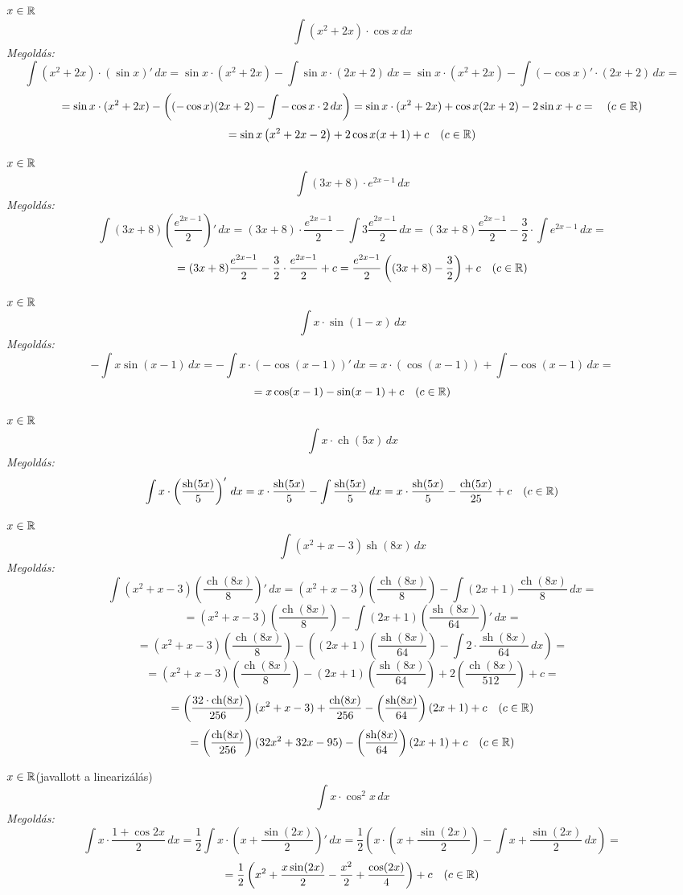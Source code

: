 \documentclass[a4paper,11.5pt]{article}
\DeclareMathOperator{\sh}{sh}
\DeclareMathOperator{\ch}{ch}
\begin{document}
	\begin{exercise}$x\in\mathbb{R}$
		\[ \int(x^2+2x)\cdot\cos x\,dx \]
		\textit{Megoldás:}
		\[ \int(x^2+2x)\cdot(\sin x)'\,dx = \sin x \cdot(x^2+2x)-\int\sin x\cdot(2x + 2)\,dx= \sin x \cdot(x^2+2x)-\int(-\cos x)'\cdot(2x + 2)\,dx= \]
		\[ =\sin x\cdot(x^2+2x)-\left((-\cos x)(2x+2)-\int-\cos x\cdot2\,dx\right)=\sin x\cdot(x^2+2x)+\cos x(2x+2)-2\sin x + c=\quad (c\in\mathbb{R}) \]
		\[ =\sin x\left(x^2+2x -2 \right)+2\cos x(x+1) + c\quad (c\in\mathbb{R}) \]
	\end{exercise}
	\begin{exercise}$x\in\mathbb{R}$
		\[ \int(3x+8)\cdot e^{2x-1}\,dx\]
		\textit{Megoldás:}
		\[\int(3x+8)\left(\frac{e^{2x-1}}{2}\right)'\,dx=(3x+8)\cdot\frac{e^{2x-1}}{2}-\int3\frac{e^{2x-1}}{2}\,dx=(3x+8)\frac{e^{2x-1}}{2}-\frac{3}{2}\cdot\int e^{2x-1}\,dx= \]
		\[ =(3x+8)\frac{e^{2x-1}}{2}-\frac{3}{2}\cdot\frac{e^{2x-1}}{2}+c=\frac{e^{2x-1}}{2}\left((3x+8)-\frac{3}{2}\right)+c\quad (c\in\mathbb{R}) \]
	\end{exercise}
	\begin{exercise}$x\in\mathbb{R}$
		\[ \int x\cdot\sin(1-x)\,dx \]
		\textit{Megoldás:}
		\[ -\int x\sin(x-1)\,dx=-\int x\cdot(-\cos(x-1))'\,dx=x\cdot(\cos(x-1))+\int-\cos(x-1)\,dx=\]
		\[=x\cos(x-1)-\sin(x-1)+c\quad (c\in\mathbb{R}) \]
	\end{exercise}
	\begin{exercise}$x\in\mathbb{R}$
		\[ \int x\cdot\ch(5x)\,dx \]
		\textit{Megoldás:}
		\[ \int x\cdot\left(\frac{\sh(5x)}{5}\right)'\,dx=x\cdot\frac{\sh(5x)}{5}-\int\frac{\sh(5x)}{5}\,dx=x\cdot\frac{\sh(5x)}{5}-\frac{\ch(5x)}{25}+c\quad (c\in\R) \]
	\end{exercise}
	\begin{exercise}$x\in\mathbb{R}$
		\[ \int(x^2+x-3)\sh(8x)\,dx \]
		\textit{Megoldás:}
		\[ \int(x^2+x-3)\left(\frac{\ch(8x)}{8}\right)'\,dx=(x^2+x-3)\left(\frac{\ch(8x)}{8}\right)-\int(2x+1)\frac{\ch(8x)}{8}\,dx=\]
		\[=(x^2+x-3)\left(\frac{\ch(8x)}{8}\right)-\int(2x+1)\left(\frac{\sh(8x)}{64}\right)'\,dx=\]
		\[=(x^2+x-3)\left(\frac{\ch(8x)}{8}\right)-\left((2x+1)\left(\frac{\sh(8x)}{64}\right)-\int2\cdot\frac{\sh(8x)}{64}\,dx\right)=\]
		\[=(x^2+x-3)\left(\frac{\ch(8x)}{8}\right)-(2x+1)\left(\frac{\sh(8x)}{64}\right)+2\left(\frac{\ch(8x)}{512}\right)+c= \]
		\[ =\left(\frac{32\cdot\ch(8x)}{256}\right)(x^2+x-3)+\frac{\ch(8x)}{256}-\left(\frac{\sh(8x)}{64}\right)(2x+1)+c\quad (c\in\R) \]
		\[ =\left(\frac{\ch(8x)}{256}\right)(32x^2+32x-95)-\left(\frac{\sh(8x)}{64}\right)(2x+1)+c\quad (c\in\R) \]
	\end{exercise}
	\begin{exercise} $x\in\mathbb{R}$\quad (javallott a linearizálás)
		\[ \int x\cdot\cos^2x\,dx \]
		\textit{Megoldás:}
		\[ \int x\cdot\frac{1+\cos2x}{2}\,dx=\frac{1}{2}\int x\cdot\left(x+\frac{\sin(2x)}{2}\right)'\,dx=\frac{1}{2}\left(x\cdot\left(x+\frac{\sin(2x)}{2}\right)-\int x+\frac{\sin(2x)}{2}\,dx\right)= \]
		\[ =\frac{1}{2}\left(x^2+\frac{x\sin(2x)}{2}-\frac{x^2}{2}+\frac{\cos(2x)}{4}\right)+c\quad (c\in\mathbb{R}) \]
	\end{exercise}
\end{document}

